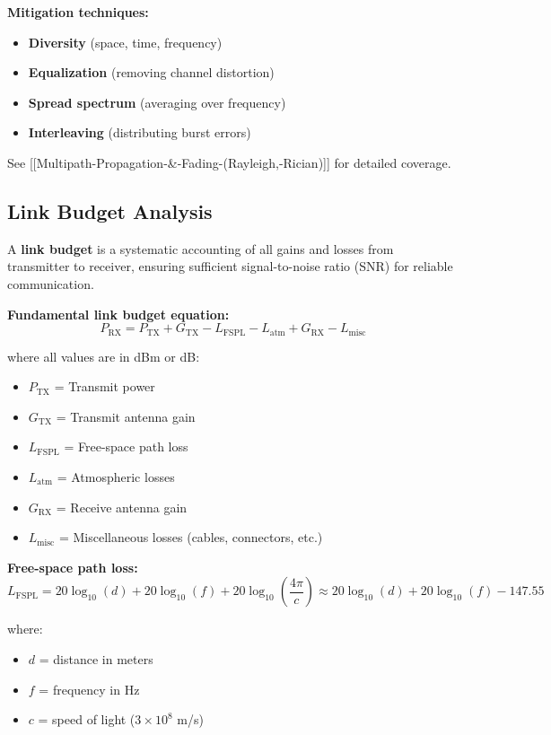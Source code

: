 \textbf{Mitigation techniques:}
\begin{itemize}
\item \textbf{Diversity} (space, time, frequency)
\item \textbf{Equalization} (removing channel distortion)
\item \textbf{Spread spectrum} (averaging over frequency)
\item \textbf{Interleaving} (distributing burst errors)
\end{itemize}

See {[}{[}Multipath-Propagation-\&-Fading-(Rayleigh,-Rician){]}{]} for detailed coverage.

\subsection{Link Budget Analysis}

A \textbf{link budget} is a systematic accounting of all gains and losses from transmitter to receiver, ensuring sufficient signal-to-noise ratio (SNR) for reliable communication.

\textbf{Fundamental link budget equation:}
\begin{equation}
P_{\text{RX}} = P_{\text{TX}} + G_{\text{TX}} - L_{\text{FSPL}} - L_{\text{atm}} + G_{\text{RX}} - L_{\text{misc}}
\label{eq:link_budget}
\end{equation}

where all values are in dBm or dB:
\begin{itemize}
\item $P_{\text{TX}}$ = Transmit power
\item $G_{\text{TX}}$ = Transmit antenna gain
\item $L_{\text{FSPL}}$ = Free-space path loss
\item $L_{\text{atm}}$ = Atmospheric losses
\item $G_{\text{RX}}$ = Receive antenna gain
\item $L_{\text{misc}}$ = Miscellaneous losses (cables, connectors, etc.)
\end{itemize}

\textbf{Free-space path loss:}
\begin{equation}
L_{\text{FSPL}} = 20\log_{10}(d) + 20\log_{10}(f) + 20\log_{10}\left(\frac{4\pi}{c}\right) \approx 20\log_{10}(d) + 20\log_{10}(f) - 147.55
\label{eq:fspl}
\end{equation}

where:
\begin{itemize}
\item $d$ = distance in meters
\item $f$ = frequency in Hz
\item $c$ = speed of light ($3 \times 10^8$ m/s)
\end{itemize}

